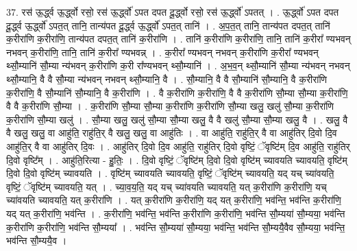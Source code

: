 \documentclass[17pt]{extarticle}
\begin{document}
37. रस॑ ऊ॒र्द्ध्व ऊ॒र्द्ध्वो रसो॒ रस॑ ऊ॒र्द्ध्वो॑ ऽपत दपत दू॒र्द्ध्वो रसो॒ रस॑ ऊ॒र्द्ध्वो॑ ऽपतत् । . ऊ॒र्द्ध्वो॑ ऽपत दपत दू॒र्द्ध्व ऊ॒र्द्ध्वो॑ ऽपत॒त् तानि॒ तान्य॑पत दू॒र्द्ध्व ऊ॒र्द्ध्वो॑ ऽपत॒त् तानि॑ । . अ॒प॒त॒त् तानि॒ तान्य॑पत दपत॒त् तानि॑ क॒रीरा॑णि क॒रीरा॑णि॒ तान्य॑पत दपत॒त् तानि॑ क॒रीरा॑णि । . तानि॑ क॒रीरा॑णि क॒रीरा॑णि॒ तानि॒ तानि॑ क॒रीरा᳚ ण्यभवन् नभवन् क॒रीरा॑णि॒ तानि॒ तानि॑ क॒रीरा᳚ ण्यभवन्न् । . क॒रीरा᳚ ण्यभवन् नभवन् क॒रीरा॑णि क॒रीरा᳚ ण्यभवन् थ्सौ॒म्यानि॑ सौ॒म्या न्य॑भवन् क॒रीरा॑णि क॒री रा᳚ण्यभवन् थ्सौ॒म्यानि॑ । . अ॒भ॒व॒न् थ्सौ॒म्यानि॑ सौ॒म्या न्य॑भवन् नभवन् थ्सौ॒म्यानि॒ वै वै सौ॒म्या न्य॑भवन् नभवन् थ्सौ॒म्यानि॒ वै । . सौ॒म्यानि॒ वै वै सौ॒म्यानि॑ सौ॒म्यानि॒ वै क॒रीरा॑णि क॒रीरा॑णि॒ वै सौ॒म्यानि॑ सौ॒म्यानि॒ वै क॒रीरा॑णि । . वै क॒रीरा॑णि क॒रीरा॑णि॒ वै वै क॒रीरा॑णि सौ॒म्या सौ॒म्या क॒रीरा॑णि॒ वै वै क॒रीरा॑णि सौ॒म्या । . क॒रीरा॑णि सौ॒म्या सौ॒म्या क॒रीरा॑णि क॒रीरा॑णि सौ॒म्या खलु॒ खलु॑ सौ॒म्या क॒रीरा॑णि क॒रीरा॑णि सौ॒म्या खलु॑ । . सौ॒म्या खलु॒ खलु॑ सौ॒म्या सौ॒म्या खलु॒ वै वै खलु॑ सौ॒म्या सौ॒म्या खलु॒ वै । . खलु॒ वै वै खलु॒ खलु॒ वा आहु॑ति॒ राहु॑ति॒र् वै खलु॒ खलु॒ वा आहु॑तिः । . वा आहु॑ति॒ राहु॑ति॒र् वै वा आहु॑तिर् दि॒वो दि॒व आहु॑ति॒र् वै वा आहु॑तिर् दि॒वः । . आहु॑तिर् दि॒वो दि॒व आहु॑ति॒ राहु॑तिर् दि॒वो वृष्टिं॒ ॅवृष्टि॑म् दि॒व आहु॑ति॒ राहु॑तिर् दि॒वो वृष्टि᳚म् । . आहु॑ति॒रित्या - हु॒तिः॒ । . दि॒वो वृष्टिं॒ ॅवृष्टि॑म् दि॒वो दि॒वो वृष्टि॑म् च्यावयति च्यावयति॒ वृष्टि॑म् दि॒वो दि॒वो वृष्टि॑म् च्यावयति । . वृष्टि॑म् च्यावयति च्यावयति॒ वृष्टिं॒ ॅवृष्टि॑म् च्यावयति॒ यद् यच् च्या॑वयति॒ वृष्टिं॒ ॅवृष्टि॑म् च्यावयति॒ यत् । . च्या॒व॒य॒ति॒ यद् यच् च्या॑वयति च्यावयति॒ यत् क॒रीरा॑णि क॒रीरा॑णि॒ यच् च्या॑वयति च्यावयति॒ यत् क॒रीरा॑णि । . यत् क॒रीरा॑णि क॒रीरा॑णि॒ यद् यत् क॒रीरा॑णि॒ भव॑न्ति॒ भव॑न्ति क॒रीरा॑णि॒ यद् यत् क॒रीरा॑णि॒ भव॑न्ति । . क॒रीरा॑णि॒ भव॑न्ति॒ भव॑न्ति क॒रीरा॑णि क॒रीरा॑णि॒ भव॑न्ति सौ॒म्यया॑ सौ॒म्यया॒ भव॑न्ति क॒रीरा॑णि क॒रीरा॑णि॒ भव॑न्ति सौ॒म्यया᳚ । . भव॑न्ति सौ॒म्यया॑ सौ॒म्यया॒ भव॑न्ति॒ भव॑न्ति सौ॒म्ययै॒वैव सौ॒म्यया॒ भव॑न्ति॒ भव॑न्ति सौ॒म्ययै॒व । \newline
\pagebreak
{}
\end{document}
